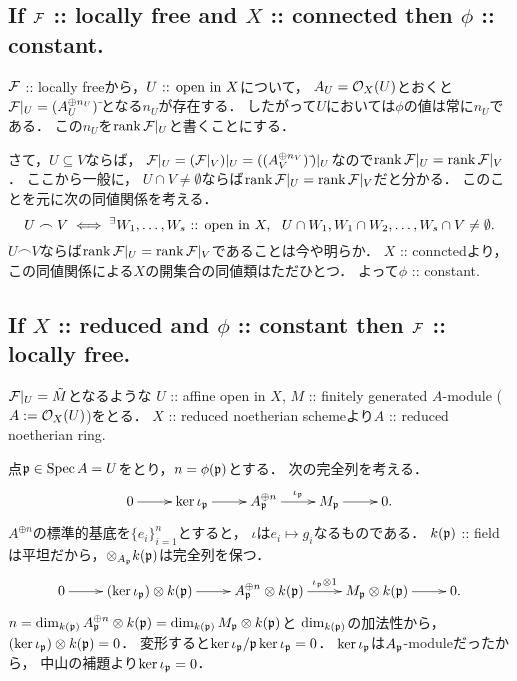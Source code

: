 \documentclass[a4paper]{jsarticle}
\begin{document}
    \subsection{If $\mathcal{F}$ :: locally free and $X$ :: connected then $\phi$ :: constant.}
    $\mathcal{F}$ :: locally freeから，$U \text{ :: open in } X$について，
    $A_U=\mathcal{O}_X(U)$とおくと$\mathcal{F}|_U=(A_U^{\oplus n_U})\,\tilde{}$となる$n_U$が存在する．
    したがって$U$においては$\phi$の値は常に$n_U$である．
    この$n_U$を$\operatorname{rank} \mathcal{F}|_U$と書くことにする．

    さて，$U \subseteq V$ならば，
    $\mathcal{F}|_U=(\mathcal{F}|_V)|_U=((A_V^{\oplus n_V})\,\tilde{})|_U$なので$\operatorname{rank} \mathcal{F}|_U=\operatorname{rank} \mathcal{F}|_V$．
    ここから一般に，
    $U \cap V \neq \emptyset$ならば$\operatorname{rank} \mathcal{F}|_U=\operatorname{rank} \mathcal{F}|_V$だと分かる．
    このことを元に次の同値関係を考える．
    \[ U \frown V \iff {}^{\exists} W_1,\dots,W_s \text{ :: open in } X,~~ U \cap W_1, W_1 \cap W_2, \dots, W_s \cap V \neq \emptyset. \]
    $U \frown V$ならば$\operatorname{rank} \mathcal{F}|_U=\operatorname{rank} \mathcal{F}|_V$であることは今や明らか．
    $X$ :: connctedより，この同値関係による$X$の開集合の同値類はただひとつ．
    よって$\phi$ :: constant.

    \subsection{If $X$ :: reduced and $\phi$ :: constant then $\mathcal{F}$ :: locally free.}
    $\mathcal{F}|_U=\tilde{M}$となるような
    $U$ :: affine open in $X$, 
    $M$ :: finitely generated $A$-module ($A:=\mathcal{O}_X(U)$)をとる．
    $X$ :: reduced noetherian schemeより$A$ :: reduced noetherian ring.
    
    点$\mathfrak{p} \in \operatorname{Spec} A=U$をとり，$n=\phi(\mathfrak{p})$とする．
    次の完全列を考える．
    \[
        \xymatrix
        {
            0 \ar[r]& \ker \iota_{\I{p}} \ar[r]& A_{\I{p}}^{\oplus n} \ar[r]^-{\iota_{\I{p}}}& M_{\I{p}} \ar[r]& 0.
        }
    \]
    $A^{\oplus n}$の標準的基底を$\{e_i\}_{i=1}^n$とすると，
    $\iota$は$e_i \mapsto g_i$なるものである．
    $k(\mathfrak{p})$ :: fieldは平坦だから，$\otimes_{A_{\mathfrak{p}}} k(\mathfrak{p})$は完全列を保つ．
    \[
        \xymatrix
        {
            0 \ar[r]
            & (\ker \iota_{\I{p}}) \otimes k(\I{p}) \ar[r]
            & A_{\I{p}}^{\oplus n}\otimes k(\I{p}) \ar[r]^-{\iota_{\I{p}} \otimes 1}
            & M_{\I{p}} \otimes k(\I{p}) \ar[r]& 0.
        }
    \]
    $n=\dim_{k(\mathfrak{p})} A_{\mathfrak{p}}^{\oplus n}\otimes k(\mathfrak{p})=\dim_{k(\mathfrak{p})} M_{\mathfrak{p}} \otimes k(\mathfrak{p})$と
    $\dim_{k(\mathfrak{p})}$の加法性から，
    $(\ker \iota_{\mathfrak{p}}) \otimes k(\mathfrak{p})=0$．
    変形すると$\ker \iota_{\mathfrak{p}}/\mathfrak{p}\ker \iota_{\mathfrak{p}}=0$．
    $\ker \iota_{\mathfrak{p}}$は$A_{\mathfrak{p}}$-moduleだったから，
    中山の補題より$\ker \iota_{\mathfrak{p}}=0$．
\end{document}
